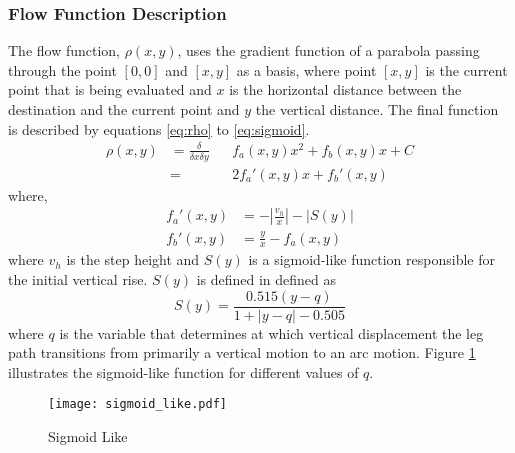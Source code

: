             \subsubsection{Flow Function Description} \label{sec:flow_function}
                The flow function, \(\rho(x,y)\), uses the gradient function of a parabola passing through the point \([0,0]\) and \([x,y]\) as a basis, where point \([x,y]\)
                is the current point that is being evaluated and \(x\) is the horizontal distance between the destination and the current point and \(y\) the
                vertical distance. The final function is described by equations \ref{eq:rho} to \ref{eq:sigmoid}.
                \begin{equation} \label{eq:rho}
                    \begin{aligned}
                        \rho(x,y) &= \frac{\delta}{\delta x\delta y}&&f_a(x,y)x^2 + f_b(x,y)x + C\\
                        &= &&2f_a'(x,y)x + f_b'(x,y)    
                    \end{aligned}
                \end{equation}
                where, %
                \begin{align} \label{eq:fa}
                    f_a'(x,y) &= -\left|\frac{v_h}{x}\right| - \left|S(y)\right|\\
                    f_b'(x,y) &= \frac{y}{x} - f_a(x,y)
                \end{align}
                where \(v_h\) is the step height and \(S(y)\) is a sigmoid-like function responsible for the initial vertical rise. \(S(y)\) is defined in defined as
                \begin{equation} \label{eq:sigmoid}
                    S(y) = \frac{0.515(y-q)}{1+\left|y-q\right|-0.505}
                \end{equation}
                where \(q\) is the variable that determines at which vertical displacement the leg path transitions from primarily a vertical motion to an arc motion. Figure \ref{fig:sigmoid_like} illustrates the sigmoid-like function for different values of \(q\).
                \begin{figure}[h]
                    \centering
                    \hspace{-1.38cm}
                    \texttt{[image: sigmoid\_like.pdf]}
                    \caption{Sigmoid Like}
                    \label{fig:sigmoid_like}
                \end{figure}

